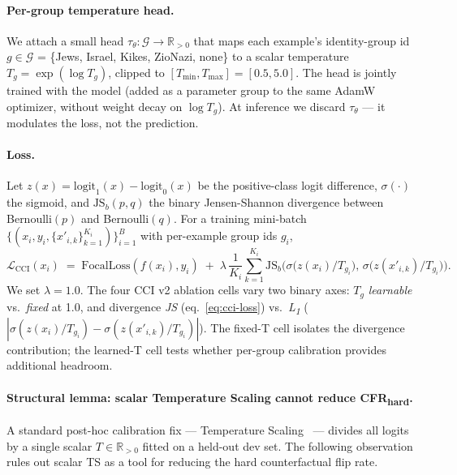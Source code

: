 \documentclass[10pt,a4paper]{article}
\begin{document}
\paragraph{Per-group temperature head.}
We attach a small head $\tau_\theta : \mathcal{G} \to \mathbb{R}_{>0}$ that maps each example's identity-group id $g \in \mathcal{G}$ = \{Jews, Israel, Kikes, ZioNazi, none\} to a scalar temperature $T_g = \exp(\log T_g)$, clipped to $[T_{\min}, T_{\max}] = [0.5, 5.0]$. The head is jointly trained with the model (added as a parameter group to the same AdamW optimizer, without weight decay on $\log T_g$). At inference we discard $\tau_\theta$ --- it modulates the loss, not the prediction.

\paragraph{Loss.}
Let $z(x) = \mathrm{logit}_1(x) - \mathrm{logit}_0(x)$ be the positive-class logit difference, $\sigma(\cdot)$ the sigmoid, and $\mathrm{JS}_b(p, q)$ the binary Jensen-Shannon divergence between Bernoulli$(p)$ and Bernoulli$(q)$. For a training mini-batch $\{(x_i, y_i, \{x'_{i,k}\}_{k=1}^{K_i})\}_{i=1}^{B}$ with per-example group ids $g_i$,
\begin{equation}
\mathcal{L}_{\text{CCI}}(x_i)
\;=\;
\mathrm{FocalLoss}(f(x_i), y_i)
\;+\;
\lambda \,\frac{1}{K_i}\sum_{k=1}^{K_i}
\mathrm{JS}_b\!\Big(\sigma\!\big(z(x_i) / T_{g_i}\big),\,
                     \sigma\!\big(z(x'_{i,k}) / T_{g_i}\big)\Big).
\label{eq:cci-loss}
\end{equation}
We set $\lambda = 1.0$. The four CCI v2 ablation cells vary two binary axes: $T_g$ \emph{learnable} vs.\ \emph{fixed} at 1.0, and divergence \emph{JS} (eq.~\ref{eq:cci-loss}) vs.\ \emph{L\textsubscript{1}} ($|\sigma(z(x_i)/T_{g_i}) - \sigma(z(x'_{i,k})/T_{g_i})|$). The fixed-T cell isolates the divergence contribution; the learned-T cell tests whether per-group calibration provides additional headroom.

\paragraph{Structural lemma: scalar Temperature Scaling cannot reduce CFR\textsubscript{hard}.}
\label{para:ts-cfr}
A standard post-hoc calibration fix --- Temperature Scaling~\citep{guo2017calibration} --- divides all logits by a single scalar $T \in \mathbb{R}_{>0}$ fitted on a held-out dev set. The following observation rules out scalar TS as a tool for reducing the hard counterfactual flip rate.
\end{document}
